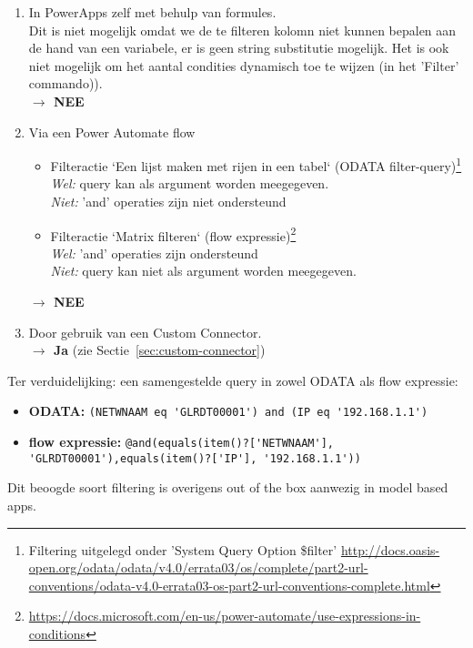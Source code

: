 \begin{enumerate}
    \item In PowerApps zelf met behulp van formules.\\
    Dit is niet mogelijk omdat we de te filteren kolomn niet kunnen bepalen aan de hand van een variabele, er is geen string substitutie mogelijk. Het is ook niet mogelijk om het aantal condities dynamisch toe te wijzen (in het 'Filter' commando)).\\
    \textbf{$\rightarrow$ NEE}
    \item Via een Power Automate flow
    \begin{itemize}
        \item Filteractie `Een lijst maken met rijen in een tabel` (ODATA filter-query)\footnote{Filtering uitgelegd onder 'System Query Option \$filter' \url{http://docs.oasis-open.org/odata/odata/v4.0/errata03/os/complete/part2-url-conventions/odata-v4.0-errata03-os-part2-url-conventions-complete.html}}\\ 
            \textit{Wel:}  query kan als argument worden meegegeven.\\
            \textit{Niet:} 'and' operaties zijn niet ondersteund
         \item Filteractie `Matrix filteren` (flow expressie)\footnote{\url{https://docs.microsoft.com/en-us/power-automate/use-expressions-in-conditions}}\\
            \textit{Wel:} 'and' operaties zijn ondersteund\\
            \textit{Niet:} query kan niet als argument worden meegegeven.
    \end{itemize}
    \textbf{$\rightarrow$ NEE}
    \item Door gebruik van een Custom Connector.\\
    \textbf{$\rightarrow$ Ja}
    (zie Sectie~\ref{sec:custom-connector})
\end{enumerate}

Ter verduidelijking: een samengestelde query in zowel ODATA als flow expressie:
\begin{itemize}
    \item \textbf{ODATA:} \lstinline|(NETWNAAM eq 'GLRDT00001') and (IP eq '192.168.1.1')|
    \item \textbf{flow expressie:} \lstinline|@and(equals(item()?['NETWNAAM'], 'GLRDT00001'),equals(item()?['IP'], '192.168.1.1'))|
\end{itemize}

Dit beoogde soort filtering is overigens out of the box aanwezig in model based apps. \autocite{MicrosoftDocs2020c}

